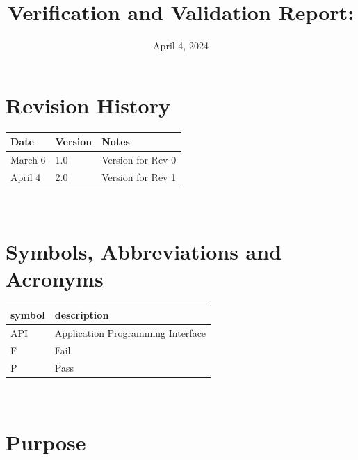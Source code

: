 \documentclass[12pt, titlepage]{article}
\begin{document}
\title{Verification and Validation Report: \progname} 
\author{\authname}
\date{April 4, 2024}
	
\maketitle


\section{Revision History}

\begin{tabularx}{\textwidth}{p{3cm}p{2cm}X}
\toprule {\bf Date} & {\bf Version} & {\bf Notes}\\
\midrule
March 6 & 1.0 & Version for Rev 0\\
April 4 & 2.0 & Version for Rev 1\\
\bottomrule
\end{tabularx}

~\newpage

\section{Symbols, Abbreviations and Acronyms}

\renewcommand{\arraystretch}{1.2}
\begin{tabular}{l l} 
  \toprule    
  \textbf{symbol} & \textbf{description}\\
  \midrule 
  API & Application Programming Interface\\
  F & Fail\\
  P & Pass\\
  \bottomrule
\end{tabular}\\


\newpage

\tableofcontents

\listoftables %

\listoffigures %

\newpage


\section{Purpose}
\end{document}
